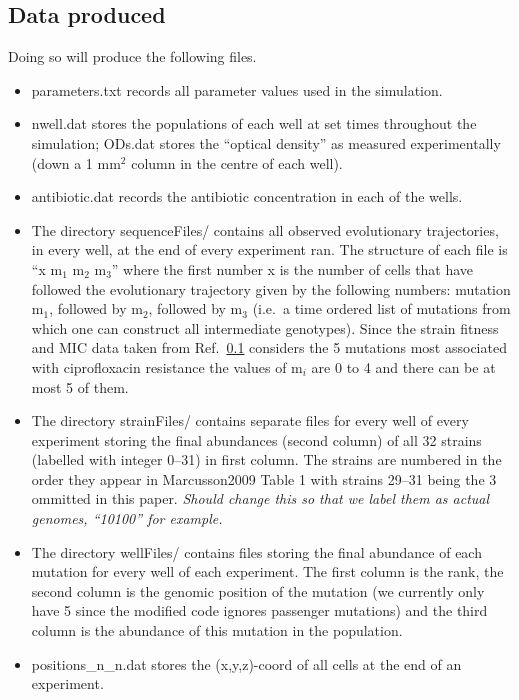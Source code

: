 \documentclass[a4paper,10pt]{article}
\begin{document}
\subsection{Data produced}
Doing so will produce the following files.
\begin{itemize}
 \item parameters.txt records all parameter values used in the simulation.
 \item nwell.dat stores the populations of each well at set times throughout the simulation; ODs.dat stores the ``optical density'' as measured 
 experimentally (down a 1 mm$^2$ column in the centre of each well).
 \item antibiotic.dat records the antibiotic concentration in each of the wells.
 \item The directory sequenceFiles/ contains all observed evolutionary trajectories, in every well, at the end of every experiment ran.
 The structure of each file is ``x m$_1$ m$_2$ m$_3$'' where the first number x is the number of cells that have followed the evolutionary trajectory
 given by the following numbers: mutation m$_1$, followed by m$_2$, followed by m$_3$ (i.e.~a time ordered list of mutations from which one can construct
 all intermediate genotypes). 
 Since the strain fitness and MIC data taken from Ref.~\ref{} considers the 5 mutations most associated with ciprofloxacin resistance
 the values of m$_i$ are 0 to 4 and there can be at most 5 of them.
 \item The directory strainFiles/ contains separate files for every well of every experiment storing the final abundances (second column) of all 32 strains (labelled
 with integer 0--31) in first column. The strains are numbered in the order they appear in Marcusson2009 \cite{} Table 1 with strains 29--31 being the 3 ommitted in this paper.
 \emph{Should change this so that we label them as actual genomes, ``10100'' for example.}
 \item The directory wellFiles/ contains files storing the final abundance of each mutation for every well of each experiment. 
 The first column is the rank, the second column is the genomic position of the mutation (we currently only have 5 since the modified code ignores passenger mutations)
 and the third column is the abundance of this mutation in the population.
 \item positions\_n\_n.dat stores the (x,y,z)-coord of all cells at the end of an experiment.
\end{itemize}
\end{document}
